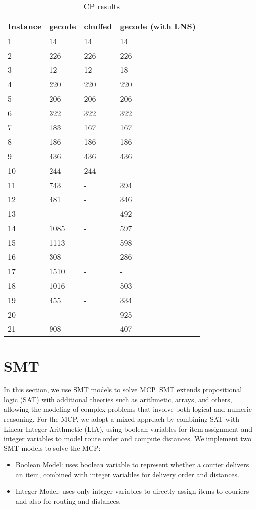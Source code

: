 \documentclass{article}
\begin{document}
\begin{table}[!ht]
    \centering
    \begin{tabular}{|l|l|l|l|}
    \hline
        Instance & gecode & chuffed & gecode (with LNS) \\ \hline
        1 & 14 & 14 & 14 \\ \hline
        2 & 226 & 226 & 226 \\ \hline
        3 & 12 & 12 & 18 \\ \hline
        4 & 220 & 220 & 220 \\ \hline
        5 & 206 & 206 & 206 \\ \hline
        6 & 322 & 322 & 322 \\ \hline
        7 & 183 & 167 & 167 \\ \hline
        8 & 186 & 186 & 186 \\ \hline
        9 & 436 & 436 & 436 \\ \hline
        10 & 244 & 244 & - \\ \hline
        11 & 743 & - & 394 \\ \hline
        12 & 481 & - & 346 \\ \hline
        13 & - & - & 492 \\ \hline
        14 & 1085 & - & 597 \\ \hline
        15 & 1113 & - & 598 \\ \hline
        16 & 308 & - & 286 \\ \hline
        17 & 1510 & - & - \\ \hline
        18 & 1016 & - & 503 \\ \hline
        19 & 455 & - & 334 \\ \hline
        20 & - & - & 925 \\ \hline
        21 & 908 & - & 407 \\ \hline
    \end{tabular}
\label{table:cp-table}
\caption{CP results}
\end{table}

\section{SMT}
In this section, we use SMT models to solve MCP. SMT extends propositional logic (SAT) with additional theories such as arithmetic, arrays, and others, allowing the modeling of complex problems that involve both logical and numeric reasoning.
For the MCP, we adopt a mixed approach by combining SAT with Linear Integer Arithmetic (LIA), using boolean variables for item assignment and integer variables to model route order and compute distances. 
We implement two SMT models to solve the MCP:
\begin{itemize}
    \item 
    Boolean Model: uses boolean variable to represent whether a courier delivers an item, combined with integer variables for delivery order and distances.
    \item 
    Integer Model: uses only integer variables to directly assign items to couriers and also for routing and distances.
\end{itemize}
\end{document}

